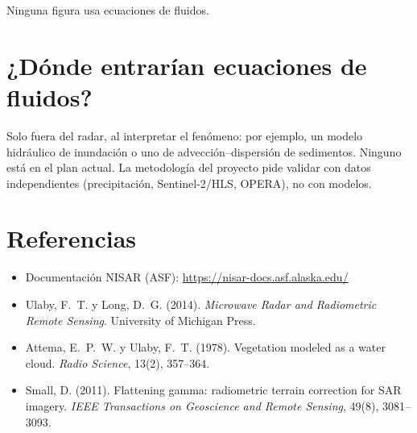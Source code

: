 \documentclass[11pt,a4paper]{article}
\begin{document}
Ninguna figura usa ecuaciones de fluidos.

\section{¿Dónde entrarían ecuaciones de fluidos?}

Solo fuera del radar, al interpretar el fenómeno: por ejemplo, un modelo hidráulico de inundación o
uno de advección--dispersión de sedimentos. Ninguno está en el plan actual. La metodología del
proyecto pide validar con datos independientes (precipitación, Sentinel-2/HLS, OPERA), no con
modelos.

\section*{Referencias}
\begin{itemize}
  \item Documentación NISAR (ASF): \url{https://nisar-docs.asf.alaska.edu/}
  \item Ulaby, F.~T. y Long, D.~G. (2014). \emph{Microwave Radar and Radiometric Remote Sensing}.
        University of Michigan Press.
  \item Attema, E.~P.~W. y Ulaby, F.~T. (1978). Vegetation modeled as a water cloud.
        \emph{Radio Science}, 13(2), 357--364.
  \item Small, D. (2011). Flattening gamma: radiometric terrain correction for SAR imagery.
        \emph{IEEE Transactions on Geoscience and Remote Sensing}, 49(8), 3081--3093.
\end{itemize}
\end{document}
